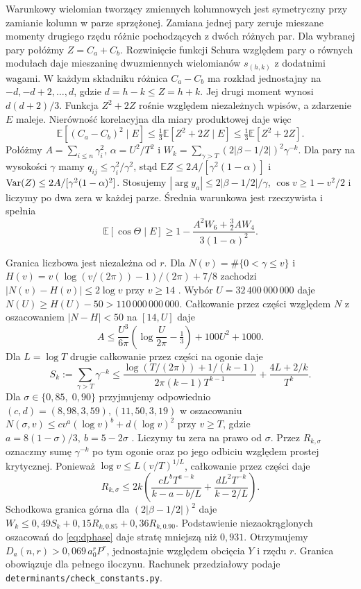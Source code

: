 \documentclass[11pt,a4paper,reqno]{amsart}
\numberwithin{equation}{section}
\begin{document}
Warunkowy wielomian tworzący zmiennych kolumnowych jest symetryczny przy zamianie kolumn w parze sprzężonej. Zamiana jednej pary zeruje mieszane momenty drugiego rzędu różnic pochodzących z dwóch różnych par. Dla wybranej pary połóżmy \(Z=C_a+C_b\). Rozwinięcie funkcji Schura względem pary o równych modułach daje mieszaninę dwuzmiennych wielomianów \(s_{(h,k)}\) z dodatnimi wagami. W każdym składniku różnica \(C_a-C_b\) ma rozkład jednostajny na \(-d,-d+2,\dots,d\), gdzie \(d=h-k\le Z=h+k\). Jej drugi moment wynosi \(d(d+2)/3\). Funkcja \(Z^2+2Z\) rośnie względem niezależnych wpisów, a zdarzenie \(E\) maleje. Nierówność korelacyjna dla miary produktowej daje więc
\[
 \mathbb E[(C_a-C_b)^2\mid E]\le \tfrac13\mathbb E[Z^2+2Z\mid E]\le\tfrac13\mathbb E[Z^2+2Z].
\]
Połóżmy \(A=\sum_{i\le n}\gamma_i^2\), \(\alpha=U^2/T^2\) i \(W_k=\sum_{\gamma>T}(2|\beta-1/2|)^2\gamma^{-k}\). Dla pary na wysokości \(\gamma\) mamy \(q_{ij}\le\gamma_i^2/\gamma^2\), stąd \(\mathbb EZ\le2A/[\gamma^2(1-\alpha)]\) i \({\rm Var}(Z)\le2A/[\gamma^2(1-\alpha)^2]\). Stosujemy \(|\arg y_a|\le2|\beta-1/2|/\gamma\), \(\cos v\ge1-v^2/2\) i liczymy po dwa zera w każdej parze. Średnia warunkowa jest rzeczywista i spełnia
\begin{equation}\label{eq:dphase}
 \mathbb E[\cos\Theta\mid E]\ge1-\frac{A^2W_6+\tfrac32 A W_4}{3(1-\alpha)^2}.
\end{equation}

Granica liczbowa jest niezależna od \(r\). Dla \(N(v)=\#\{0<\gamma\le v\}\) i \(H(v)=v(\log(v/(2\pi))-1)/(2\pi)+7/8\) zachodzi \(|N(v)-H(v)|\le2\log v\) przy \(v\ge14\) \cite[(3)]{dusart}. Wybór \(U=32\,400\,000\,000\) daje \(N(U)\ge H(U)-50>110\,000\,000\,000\). Całkowanie przez części względem \(N\) z oszacowaniem \(|N-H|<50\) na \([14,U]\) daje
\[
 A\le\frac{U^3}{6\pi}\left(\log\frac{U}{2\pi}-\tfrac13\right)+100U^2+1000 .
\]
Dla \(L=\log T\) drugie całkowanie przez części na ogonie daje
\[
 S_k:=\sum_{\gamma>T}\gamma^{-k}\le
 \frac{\log(T/(2\pi))+1/(k-1)}{2\pi(k-1)T^{k-1}}+
 \frac{4L+2/k}{T^k}.
\]
Dla \(\sigma\in\{0{,}85,\;0{,}90\}\) przyjmujemy odpowiednio \((c,d)=(8{,}98,3{,}59),(11{,}50,3{,}19)\) w oszacowaniu \(N(\sigma,v)\le c v^a(\log v)^b+d(\log v)^2\) przy \(v\ge T\), gdzie \(a=8(1-\sigma)/3,\ b=5-2\sigma\) \cite[tabela~1 i (4.71)]{kln}. Liczymy tu zera na prawo od \(\sigma\). Przez \(R_{k,\sigma}\) oznaczmy sumę \(\gamma^{-k}\) po tym ogonie oraz po jego odbiciu względem prostej krytycznej. Ponieważ \(\log v\le L(v/T)^{1/L}\), całkowanie przez części daje
\[
 R_{k,\sigma}\le 2k\left(
 \frac{cL^b T^{a-k}}{k-a-b/L}+\frac{dL^2T^{-k}}{k-2/L}\right).
\]
Schodkowa granica górna dla \((2|\beta-1/2|)^2\) daje \(W_k\le0{,}49S_k+0{,}15R_{k,0.85}+0{,}36R_{k,0.90}\). Podstawienie niezaokrąglonych oszacowań do \eqref{eq:dphase} daje stratę mniejszą niż \(0{,}931\). Otrzymujemy \(D_a(n,r)>0{,}069\,a_0^r P^r\), jednostajnie względem obcięcia \(Y\) i rzędu \(r\). Granica obowiązuje dla pełnego iloczynu. Rachunek przedziałowy podaje \texttt{determinants/check\_constants.py}.
\end{document}
